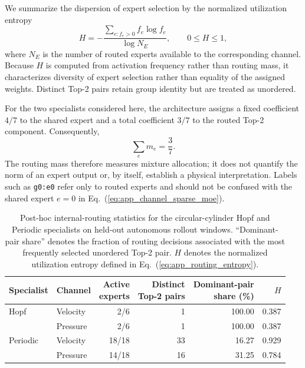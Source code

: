 \documentclass{article}
\def\plaineqref#1{\ref{#1}}
\begin{document}
We summarize the dispersion of expert selection by the normalized utilization entropy
\begin{equation}
  H
  =
  -\frac{
    \sum_{e:f_e>0} f_e\log f_e
  }{
    \log N_E
  },
  \qquad
  0\le H\le1,
  \label{eq:app_routing_entropy}
\end{equation}
where $N_E$ is the number of routed experts available to the corresponding channel. Because $H$ is computed from activation frequency rather than routing mass, it characterizes diversity of expert selection rather than equality of the assigned weights. Distinct Top-2 pairs retain group identity but are treated as unordered.

For the two specialists considered here, the architecture assigns a fixed coefficient $4/7$ to the shared expert and a total coefficient $3/7$ to the routed Top-2 component. Consequently,
\begin{equation}
  \sum_e m_e=\frac{3}{7}.
\end{equation}
The routing mass therefore measures mixture allocation; it does not quantify the norm of an expert output or, by itself, establish a physical interpretation.
Labels such as \texttt{g0:e0} refer only to routed experts and should not be confused with the shared expert $e=0$ in
Eq.~(\plaineqref{eq:app_channel_sparse_moe}).

\par
\begin{table}[H]
\centering
\caption{
Post-hoc internal-routing statistics for the circular-cylinder Hopf and Periodic specialists on held-out autonomous rollout windows. ``Dominant-pair share'' denotes the fraction of routing decisions associated with the most frequently selected unordered Top-2 pair. $H$ denotes the normalized utilization entropy defined in Eq.~(\plaineqref{eq:app_routing_entropy}).
}
\label{tab:internal_routing_summary}
\small
\setlength{\tabcolsep}{5pt}
\begin{tabular}{@{}llrrrr@{}}
\toprule
Specialist & Channel & \shortstack{Active\\experts} & \shortstack{Distinct\\Top-2 pairs} & \shortstack{Dominant-pair\\share (\%)} & $H$ \\
\midrule
Hopf & Velocity & 2/6 & 1 & 100.00 & 0.387 \\
     & Pressure & 2/6 & 1 & 100.00 & 0.387 \\
\addlinespace
Periodic & Velocity & 18/18 & 33 & 16.27 & 0.929 \\
         & Pressure & 14/18 & 16 & 31.25 & 0.784 \\
\bottomrule
\end{tabular}
\end{table}
\par
\end{document}

